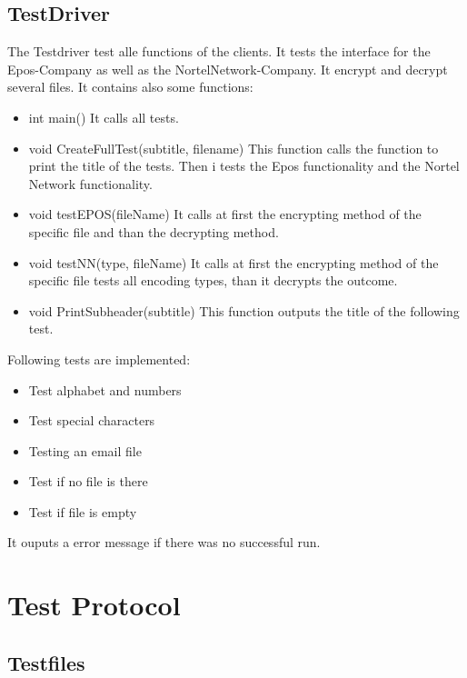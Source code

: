 \subsection{TestDriver}
The Testdriver test alle functions of the clients. It tests the interface for the Epos-Company as well as the NortelNetwork-Company. It encrypt and decrypt several files. It contains also some functions:
\begin{itemize}
\item int main()
\subitem It calls all tests.

\item void CreateFullTest(subtitle, filename)
\subitem This function calls the function to print the title of the tests. Then i tests the Epos functionality and the Nortel Network functionality.

\item void testEPOS(fileName)
\subitem It calls at first the encrypting method of the specific file and than the decrypting method.

\item void testNN(type, fileName)
\subitem It calls at first the encrypting method of the specific file tests all encoding types, than it decrypts the outcome.

\item void PrintSubheader(subtitle)
\subitem This function outputs the title of the following test.
\end{itemize}
Following tests are implemented:
\begin{itemize}
\item Test alphabet and numbers
\item Test special characters
\item Testing an email file
\item Test if no file is there
\item Test if file is empty
\end{itemize}
It ouputs a error message if there was no successful run.

\newpage
\section{Test Protocol}

\subsection{Testfiles}
\subsubsection{}

